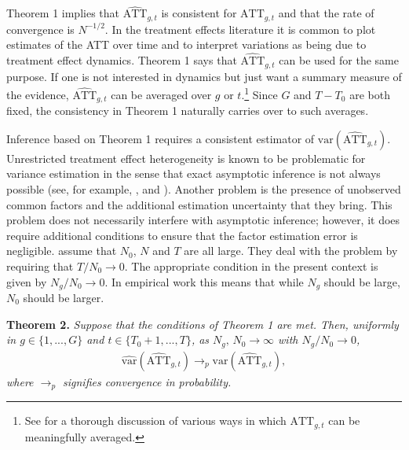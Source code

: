 \documentclass[12pt,fleqn]{article}
\begin{document}
  Theorem 1 implies that $\widehat{\mathrm{ATT}}_{g,t}$ is consistent for $\mathrm{ATT}_{g,t}$ and that the rate of convergence is $N^{-1/2}$. In the treatment effects literature it is common to plot estimates of the ATT over time and to interpret variations as being due to treatment effect dynamics. Theorem 1 says that $\widehat{\mathrm{ATT}}_{g,t}$ can be used for the same purpose. If one is not interested in dynamics but just want a summary measure of the evidence, $\widehat{\mathrm{ATT}}_{g,t}$ can be averaged over $g$ or $t$.\footnote{See \citet{Callaway_SantAnna_2020} for a thorough discussion of various ways in which $\mathrm{ATT}_{g,t}$ can be meaningfully averaged.} Since $G$ and $T-T_0$ are both fixed, the consistency in Theorem 1 naturally carries over to such averages.
  
  Inference based on Theorem 1 requires a consistent estimator of $\mathrm{var}(\widehat{\mathrm{ATT}}_{g,t})$. Unrestricted treatment effect heterogeneity is known to be problematic for variance estimation in the sense that exact asymptotic inference is not always possible (see, for example, \citealp{borusyak2021revisiting}, and \citealp{deChaisemartin_DHaultfoeuille_2020}). Another problem is the presence of unobserved common factors and the additional estimation uncertainty that they bring. This problem does not necessarily interfere with asymptotic inference; however, it does require additional conditions to ensure that the factor estimation error is negligible. \citet{chan2022pcdid} assume that $N_0$, $N$ and $T$ are all large. They deal with the problem by requiring that $T/N_0 \to 0$. The appropriate condition in the present context is given by $N_g/N_0 \to 0$. In empirical work this means that while $N_g$ should be large, $N_0$ should be larger.
  
  \bigskip
  
  \noindent \textbf{Theorem 2.} \emph{Suppose that the conditions of Theorem 1 are met. Then, uniformly in $g \in \{1,...,G\}$ and $t\in \{ T_0+1,...,T \}$, as $N_g,\,N_0\to\infty$ with $N_g/N_0 \to 0$,}
  \begin{align}
  \widehat{\mathrm{var}}(\widehat{\mathrm{ATT}}_{g,t}) \to_p \mathrm{var}(\widehat{\mathrm{ATT}}_{g,t}),
  \end{align}
  \emph{where $\to_p$ signifies convergence in probability.}
  
  \bigskip
  
\end{document}
